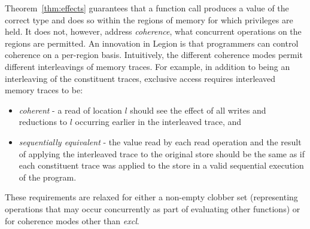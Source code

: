 Theorem~\ref{thm:effects} guarantees that a function call produces a value of the
correct type and does so within the regions of memory for which privileges are held.
It does not, however, address {\em coherence}, what concurrent operations on the regions are permitted.
An innovation in Legion is that programmers can control coherence on a per-region basis.  Intuitively,
the different coherence modes permit different interleavings of memory traces.  For example,
in addition to being an interleaving of the constituent traces, exclusive access requires interleaved memory traces to be:
\begin{itemize}
\item {\em coherent} - a read of location $l$ should see the effect of all writes and reductions to $l$
occurring earlier in the interleaved trace, and
\item {\em sequentially equivalent} - the value read by each read 
operation and the result of applying the interleaved trace to the original store should be the same as if each constituent trace
was applied to the store in a valid sequential execution of the program.
\end{itemize}
These requirements are relaxed for either a non-empty clobber set (representing
operations that may occur concurrently as part of evaluating other functions) or for coherence
modes other than {\em excl}.

